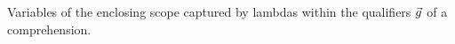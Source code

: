 Variables of the enclosing scope captured by lambdas within the qualifiers $\seq{g}$ of a comprehension.
